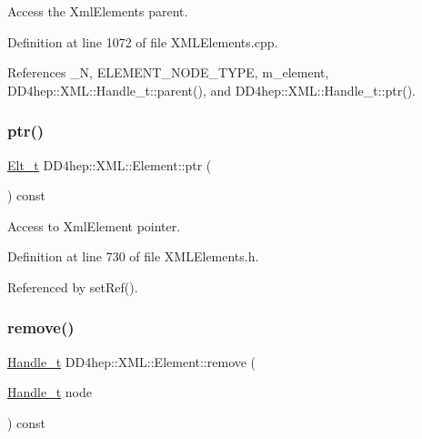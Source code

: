 Access the Xml\+Elements parent. 



Definition at line 1072 of file X\+M\+L\+Elements.\+cpp.



References \+\_\+N, E\+L\+E\+M\+E\+N\+T\+\_\+\+N\+O\+D\+E\+\_\+\+T\+Y\+PE, m\+\_\+element, D\+D4hep\+::\+X\+M\+L\+::\+Handle\+\_\+t\+::parent(), and D\+D4hep\+::\+X\+M\+L\+::\+Handle\+\_\+t\+::ptr().

\hypertarget{class_d_d4hep_1_1_x_m_l_1_1_element_a990d7d1d7a5343fb69bc46e0a8eca94a}{}\label{class_d_d4hep_1_1_x_m_l_1_1_element_a990d7d1d7a5343fb69bc46e0a8eca94a} 
\subsubsection{\texorpdfstring{ptr()}{ptr()}}
{\footnotesize\ttfamily \hyperlink{class_d_d4hep_1_1_x_m_l_1_1_element_af63782f6873c3d8c9b28e1777cde9275}{Elt\+\_\+t} D\+D4hep\+::\+X\+M\+L\+::\+Element\+::ptr (\begin{DoxyParamCaption}{ }\end{DoxyParamCaption}) const\hspace{0.3cm}{\ttfamily [inline]}}



Access to Xml\+Element pointer. 



Definition at line 730 of file X\+M\+L\+Elements.\+h.



Referenced by set\+Ref().

\hypertarget{class_d_d4hep_1_1_x_m_l_1_1_element_a2588f94bc13d2007c159592715714bfc}{}\label{class_d_d4hep_1_1_x_m_l_1_1_element_a2588f94bc13d2007c159592715714bfc} 
\subsubsection{\texorpdfstring{remove()}{remove()}}
{\footnotesize\ttfamily \hyperlink{class_d_d4hep_1_1_x_m_l_1_1_handle__t}{Handle\+\_\+t} D\+D4hep\+::\+X\+M\+L\+::\+Element\+::remove (\begin{DoxyParamCaption}\item[{\hyperlink{class_d_d4hep_1_1_x_m_l_1_1_handle__t}{Handle\+\_\+t}}]{node }\end{DoxyParamCaption}) const\hspace{0.3cm}{\ttfamily [inline]}}




